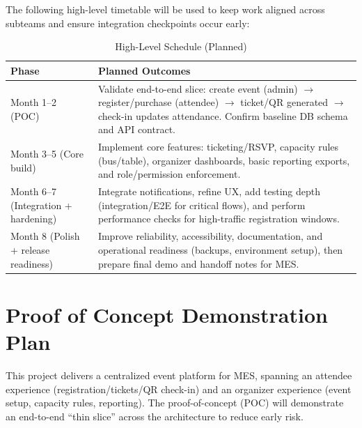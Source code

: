 \documentclass{article}
\begin{document}
\noindent The following high-level timetable will be used to keep work aligned across subteams and ensure integration checkpoints occur early:
\begin{table}[hp]
\caption{High-Level Schedule (Planned)} \label{TblHighLevelSchedule}
\begin{tabularx}{\textwidth}{lX}
\toprule
\textbf{Phase} & \textbf{Planned Outcomes} \\
\midrule
Month 1--2 (POC) & Validate end-to-end slice: create event (admin) $\rightarrow$ register/purchase (attendee) $\rightarrow$ ticket/QR generated $\rightarrow$ check-in updates attendance. Confirm baseline DB schema and API contract. \\
Month 3--5 (Core build) & Implement core features: ticketing/RSVP, capacity rules (bus/table), organizer dashboards, basic reporting exports, and role/permission enforcement. \\
Month 6--7 (Integration + hardening) & Integrate notifications, refine UX, add testing depth (integration/E2E for critical flows), and perform performance checks for high-traffic registration windows. \\
Month 8 (Polish + release readiness) & Improve reliability, accessibility, documentation, and operational readiness (backups, environment setup), then prepare final demo and handoff notes for MES. \\
\bottomrule
\end{tabularx}
\end{table}

\section{Proof of Concept Demonstration Plan}

\noindent This project delivers a centralized event platform for MES, spanning an attendee experience (registration/tickets/QR check-in) and an organizer experience (event setup, capacity rules, reporting). The proof-of-concept (POC) will demonstrate an end-to-end ``thin slice'' across the architecture to reduce early risk.
\end{document}
